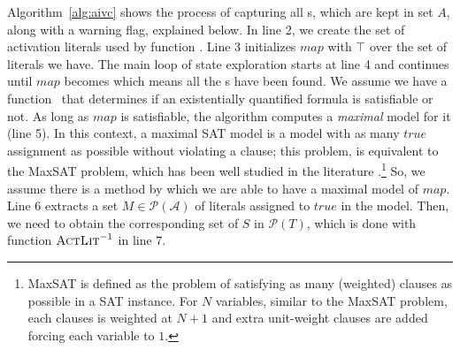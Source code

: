 Algorithm~\ref{alg:aivc} shows the process of capturing all \mivc s,
which are kept in set $A$, along with a warning flag, explained below.
In line 2, we create the set of activation
literals used by function \actlit . Line 3 initializes $map$ with
$\top$ over the set of literals we have. The main loop of state
exploration starts at line 4 and continues until $map$ becomes \unsat
which means all the \mivc s have been found. We assume we have a
function \checksat ~that determines if an existentially quantified
formula is satisfiable or not.
As long as $map$ is satisfiable, the algorithm computes a
\emph{maximal} \sat model for it (line 5). In this context,  a maximal SAT model is a
model with as many $true$ assignment as possible without violating a
clause; this problem, is equivalent
to the MaxSAT problem, which has been well studied in the
literature \cite{davies2011solving,
  morgado2013iterative}.\footnote{MaxSAT is defined as the problem of satisfying as many
(weighted) clauses as possible in a SAT instance. For $N$
variables, similar to the MaxSAT problem, each clauses is weighted at $N+1$ and extra unit-weight clauses are added forcing each variable to $1$.} So, we assume there is a method by which we
are able to have a maximal model of $map$. Line 6 extracts a set $M
\in \mathcal{P} (\mathcal{A})$ of literals assigned to $true$ in the
model. Then, we need to obtain the corresponding set of $S$ in
$\mathcal{P}(T)$, which is done with function $\textsc{ActLit} ^{-1}$ in line
7.

